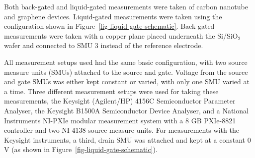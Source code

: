 \documentclass[
  a4paper,
]{scrbook}
\begin{document}
Both back-gated and liquid-gated measurements were taken of carbon
nanotube and graphene devices. Liquid-gated measurements were taken
using the configuration shown in Figure~\ref{fig-liquid-gate-schematic}.
Back-gated measurements were taken with a copper plane placed underneath
the Si/SiO\(_2\) wafer and connected to SMU 3 instead of the reference
electrode.

All measurement setups used had the same basic configuration, with two
source measure units (SMUs) attached to the source and gate. Voltage
from the source and gate SMUs was either kept constant or varied, with
only one SMU varied at a time. Three different measurement setups were
used for taking these measurements, the Keysight (Agilent/HP) 4156C
Semiconductor Parameter Analyser, the Keysight B1500A Semiconductor
Device Analyser, and a National Instruments NI-PXIe modular measurement
system with a 8 GB PXIe-8821 controller and two NI-4138 source measure
units. For measurements with the Keysight instruments, a third, drain
SMU was attached and kept at a constant 0 V (as shown in
Figure~\ref{fig-liquid-gate-schematic}).
\end{document}
